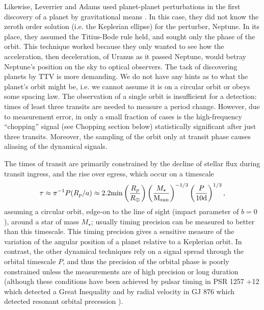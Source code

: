 \documentclass[graybox,natbib,nosecnum]{svmult}
\begin{document}
Likewise, Leverrier and Adams used planet-planet perturbations in the first discovery of a planet by gravitational means \citep{Adams1847,LeVerrier1877}. In this case, they did not know the zeroth order solution (i.e. the Keplerian ellipse) for the perturber, Neptune.  In its place, they assumed the Titius-Bode rule held, and sought only the phase of the orbit.  This technique worked because they only wanted to see how the acceleration, then deceleration, of Uranus as it passed Neptune, would betray Neptune's position on the sky to optical observers. The task of discovering planets by TTV is more demanding.  We do not have any hints as to what the planet's orbit might be, i.e. we cannot assume it is on a circular orbit or obeys some spacing law. The observation of a single orbit is insufficient for a detection: times of least three transits are needed to measure a period change. However, due to measurement error, in only a small fraction of cases is the high-frequency ``chopping'' signal (see Chopping section below) statistically significant after just three transits.  Moreover, the sampling of the orbit only at transit phase causes aliasing of the dynamical signals.

The times of transit are primarily constrained by the decline of stellar flux during transit ingress, and the rise over egress, which occur on a timescale 
\begin{equation} \label{ingress}
\tau \approx \pi^{-1} P(R_p/a) \approx 2.2 {\rm min} \left(\frac{R_p}{R_\oplus}\right) \left(\frac{M_{\star}}{\rm{M_{sun}}}\right)^{-1/3} \left(\frac{P}{10 \rm{d}}\right)^{1/3},
\end{equation}  
assuming a circular orbit, edge-on to the line of sight (impact parameter of $b=0$), around a star of mass $M_{\star}$; usually timing precision can be measured to better than this timescale.
This timing precision gives a sensitive measure of the variation of the angular position of a planet relative to a Keplerian orbit.  In contrast, the other dynamical techniques rely on a signal spread through the orbital timescale $P$, and thus the precision of the orbital phase is poorly constrained unless the measurements are of high precision or long duration (although these conditions have been achieved by pulsar timing in PSR 1257 +12 which detected a Great Inequality \citep{1994Sci...264..538W} and by radial velocity in GJ 876 which detected resonant orbital precession \citep{2001Laughlin}).
\end{document}
